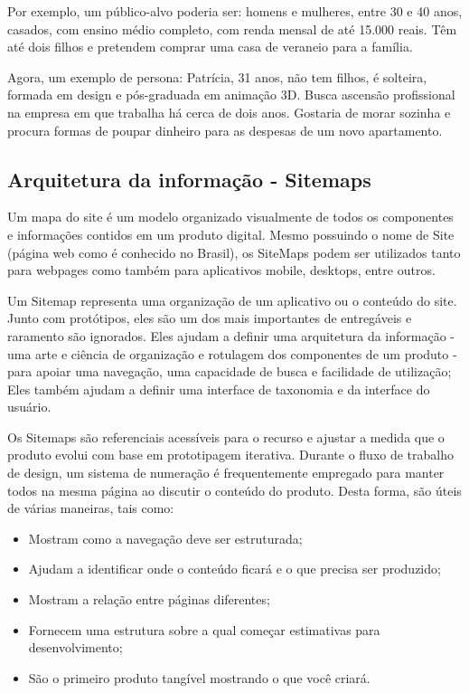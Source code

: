 Por exemplo, um público-alvo poderia ser: homens e mulheres, entre 30 e 40 anos, casados, com ensino médio completo, com renda mensal de até 15.000 reais. Têm até dois filhos e pretendem comprar uma casa de veraneio para a família.

Agora, um exemplo de persona: Patrícia, 31 anos, não tem filhos, é solteira, formada em design e pós-graduada em animação 3D. Busca ascensão profissional na empresa em que trabalha há cerca de dois anos. Gostaria de morar sozinha e procura formas de poupar dinheiro para as despesas de um novo apartamento.

\subsection{Arquitetura da informação - Sitemaps}

Um mapa do site é um modelo organizado visualmente de todos os componentes e informações contidos em um produto digital. Mesmo possuindo o nome de Site (página web como é conhecido no Brasil), os SiteMaps podem ser utilizados tanto para webpages como também para aplicativos mobile, desktops, entre outros. 

Um Sitemap representa uma organização de um aplicativo ou o conteúdo do site. Junto com protótipos, eles são um dos mais importantes de entregáveis e raramento são ignorados. Eles ajudam a definir uma arquitetura da informação - uma arte e ciência de organização e rotulagem dos componentes de um produto - para apoiar uma navegação, uma capacidade de busca e facilidade de utilização; Eles também ajudam a definir uma interface de taxonomia e da interface do usuário.

Os Sitemaps são referenciais acessíveis para o recurso e ajustar a medida que o produto evolui com base em prototipagem iterativa. Durante o fluxo de trabalho de design, um sistema de numeração é frequentemente empregado para manter todos na mesma página ao discutir o conteúdo do produto. Desta forma, são úteis de várias maneiras, tais como:

\begin{itemize}
	\item Mostram como a navegação deve ser estruturada;
	\item Ajudam a identificar onde o conteúdo ficará e o que precisa ser produzido;
	\item Mostram a relação entre páginas diferentes;
	\item Fornecem uma estrutura sobre a qual começar estimativas para desenvolvimento;
	\item São o primeiro produto tangível mostrando o que você criará.
\end{itemize}

